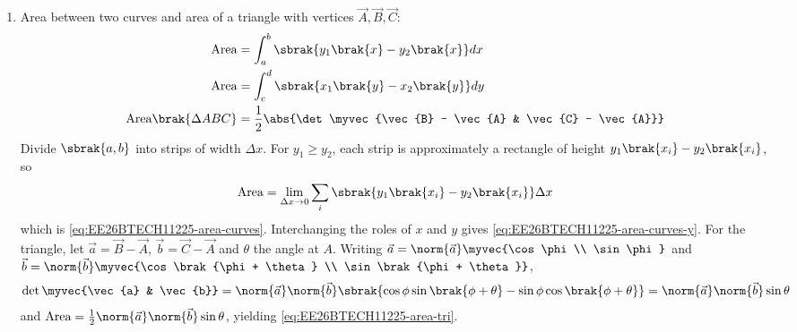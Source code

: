 \begin{enumerate}[label=\thesubsection.\arabic*, ref=\thesubsection.\theenumi]
\item Area between two curves and area of a triangle with vertices $\vec{A}, \vec{B}, \vec{C}$:
\begin{align}
	\text{Area} &= \int_a^b \sbrak{y_1\brak{x} - y_2\brak{x}}dx
	\label{eq:EE26BTECH11225-area-curves}
	\\
	\text{Area} &= \int_c^d \sbrak{x_1\brak{y} - x_2\brak{y}}dy
	\label{eq:EE26BTECH11225-area-curves-y}
	\\
	\text{Area}\brak{\Delta ABC} &= \frac{1}{2}\abs{\det\myvec{\vec{B} - \vec{A} & \vec{C} - \vec{A}}}
	\label{eq:EE26BTECH11225-area-tri}
\end{align}
\solution
Divide $\sbrak{a, b}$ into strips of width $\Delta x$. For $y_1 \geq y_2$, each strip is approximately a rectangle of height $y_1\brak{x_i} - y_2\brak{x_i}$, so
\begin{align}
	\text{Area} = \lim_{\Delta x \to 0}\sum_i \sbrak{y_1\brak{x_i} - y_2\brak{x_i}}\Delta x
\end{align}
which is \eqref{eq:EE26BTECH11225-area-curves}. Interchanging the roles of $x$ and $y$ gives \eqref{eq:EE26BTECH11225-area-curves-y}. For the triangle, let $\vec{a} = \vec{B} - \vec{A}$, $\vec{b} = \vec{C} - \vec{A}$ and $\theta$ the angle at $A$. Writing $\vec{a} = \norm{\vec{a}}\myvec{\cos\phi \\ \sin\phi}$ and $\vec{b} = \norm{\vec{b}}\myvec{\cos\brak{\phi + \theta} \\ \sin\brak{\phi + \theta}}$,
\begin{align}
	\det\myvec{\vec{a} & \vec{b}} = \norm{\vec{a}}\norm{\vec{b}}\sbrak{\cos\phi\sin\brak{\phi + \theta} - \sin\phi\cos\brak{\phi + \theta}}
	= \norm{\vec{a}}\norm{\vec{b}}\sin\theta
\end{align}
and $\text{Area} = \frac{1}{2}\norm{\vec{a}}\norm{\vec{b}}\sin\theta$, yielding \eqref{eq:EE26BTECH11225-area-tri}.


\end{enumerate}
